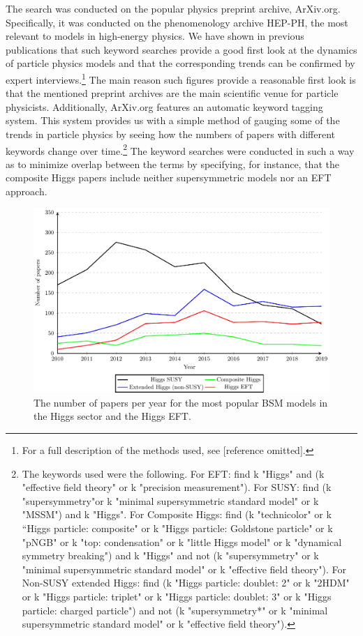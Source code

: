 The search was conducted on the popular physics preprint archive, ArXiv.org.
Specifically, it was conducted on the phenomenology archive HEP-PH, the most relevant to models in high-energy physics.
We have shown in previous publications that such keyword searches provide a good first look at the dynamics of particle physics models and that the corresponding trends can be confirmed by expert interviews.\footnote{For a full description of the methods used, see [reference omitted].}
The main reason such figures provide a reasonable first look is that the mentioned preprint archives are the main scientific venue for particle physicists.
Additionally, ArXiv.org features an automatic keyword tagging system.
This system provides us with a simple method of gauging some of the trends in particle physics by seeing how the numbers of papers with different keywords change over time.\footnote{The keywords used were the following. For EFT: find k "Higgs" and (k "effective field theory" or k "precision measurement"). For SUSY: find (k "supersymmetry"or k "minimal supersymmetric standard model" or k "MSSM") and k "Higgs". For Composite Higgs: find (k "technicolor" or k “Higgs particle: composite" or k "Higgs particle: Goldstone particle" or k "pNGB" or k "top: condensation" or k "little Higgs model" or k "dynamical symmetry breaking") and k "Higgs" and not (k "supersymmetry" or k "minimal supersymmetric standard model" or k "effective field theory"). For Non-SUSY extended Higgs: find (k "Higgs particle: doublet: 2" or k "2HDM" or k "Higgs particle: triplet" or k "Higgs particle: doublet: 3" or k "Higgs particle: charged particle") and not (k "supersymmetry*" or k "minimal supersymmetric standard model" or k "effective field theory").}
The keyword searches were conducted in such a way as to minimize overlap between the terms by specifying, for instance, that the composite Higgs papers include neither supersymmetric models nor an EFT approach. 
\begin{figure}
\includegraphics[width=\textwidth]{susyeft_2107}
\caption{The number of papers per year for the most popular BSM models in the Higgs sector and the Higgs EFT.} 
\label{fig:lineplot}
\end{figure}

